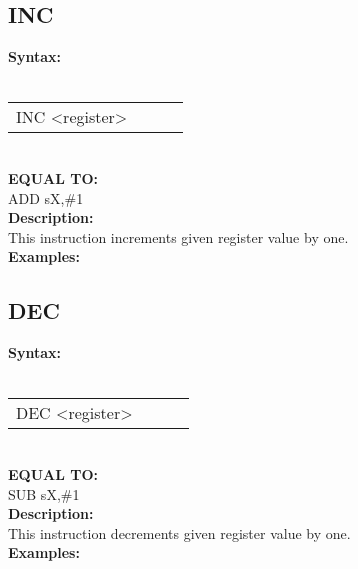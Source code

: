                 \subsection{INC}
                \textbf{Syntax:}\\
                \\ {
                    \texttt{}
                    \begin{tabular}[h!]{llll}
                            { \color{highlight_instruction} INC    } { \color{highlight_symbol} <register> }
                            { \color{highlight_comment}  }\\
                    \end{tabular}
                    }\\
                    \textbf{EQUAL TO:}\\
                    { \color{highlight_instruction} ADD    } { \color{highlight_symbol}      sX,\#1 }
                    \\
                \textbf{Description:}\\
                This instruction increments given register value by one.\\
                \textbf{Examples:}\\
                        \begin{code}[h!]
                            symbol}\verb'INC          s0' }\\
                        \end{code}
                \subsection{DEC}
                \textbf{Syntax:}\\
                \\ {
                    \texttt{}
                    \begin{tabular}[h!]{llll}
                            { \color{highlight_instruction} DEC    } { \color{highlight_symbol} <register> }
                            { \color{highlight_comment}  }\\
                    \end{tabular}
                    }\\
                    \textbf{EQUAL TO:}\\
                    { \color{highlight_instruction} SUB    } { \color{highlight_symbol}      sX,\#1 }
                    \\
                \textbf{Description:}\\
                This instruction decrements given register value by one.\\
                \textbf{Examples:}\\
                        \begin{code}[h!]
                            symbol}\verb'DEC          s0' }\\
                        \end{code}


